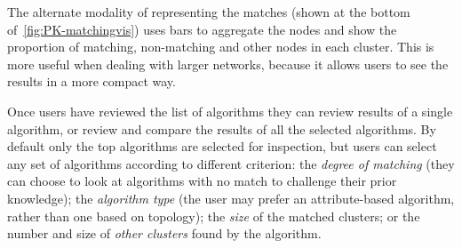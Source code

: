 The alternate modality of representing the matches (shown at the bottom of~\autoref{fig:PK-matchingvis}) uses bars to aggregate the nodes and show the proportion of matching, non-matching and other nodes in each cluster. This is more useful when dealing with larger networks, because it allows users to see the results in a more compact way.







Once users have reviewed the list of algorithms they can review results of a single algorithm, or review and compare the results of all the selected algorithms.
By default only the top algorithms are selected for inspection, but users can select any set of algorithms according to different criterion:
the \textit{degree of matching} (\ie they can choose to look at algorithms with no match to challenge their prior knowledge);
the \textit{algorithm type} (the user may prefer an attribute-based algorithm, rather than one based on topology);
the \textit{size} of the matched clusters;
or the number and size of \textit{other clusters} found by the algorithm.

